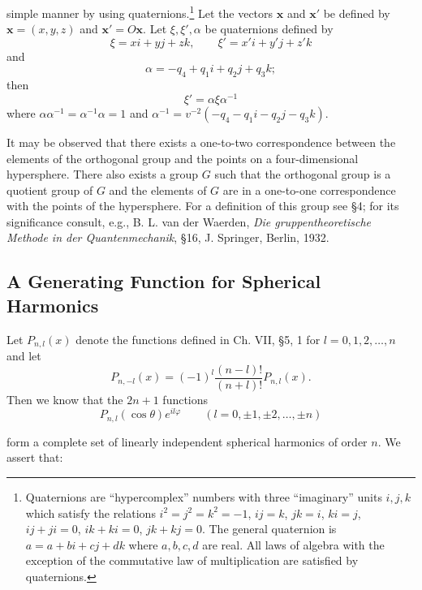 simple manner by using quaternions.\footnote{Quaternions are ``hypercomplex'' numbers with three ``imaginary'' units $i,j,k$ which satisfy the relations $i^2=j^2=k^2=-1$, $ij=k$, $jk=i$, $ki=j$, $ij+ji=0$, $ik+ki=0$, $jk+kj=0$. The general quaternion is $a=a+bi+cj+dk$ where $a,b,c,d$ are real. All laws of algebra with the exception of the commutative law of multiplication are satisfied by quaternions.}
Let the vectors $\mathbf{x}$ and $\mathbf{x}'$ be defined by $\mathbf{x}=(x,y,z)$ and $\mathbf{x}'=O\mathbf{x}$. Let $\xi,\xi',\alpha$ be quaternions defined by
\begin{equation}\tag{116}
\xi=xi+yj+zk,\qquad \xi'=x'i+y'j+z'k
\end{equation}
and
\begin{equation}\tag{116'}
\alpha=-q_4+q_1i+q_2j+q_3k;
\end{equation}
then
\begin{equation}\tag{117}
\xi'=\alpha\xi\alpha^{-1}
\end{equation}
where $\alpha\alpha^{-1}=\alpha^{-1}\alpha=1$ and
$\alpha^{-1}=v^{-2}(-q_4-q_1i-q_2j-q_3k)$.

It may be observed that there exists a one-to-two correspondence between the elements of the orthogonal group and the points on a four-dimensional hypersphere. There also exists a group $G$ such that the orthogonal group is a quotient group of $G$ and the elements of $G$ are in a one-to-one correspondence with the points of the hypersphere. For a definition of this group see \S4; for its significance consult, e.g., B. L. van der Waerden, \emph{Die gruppentheoretische Methode in der Quantenmechanik}, \S16, J. Springer, Berlin, 1932.

\subsection{A Generating Function for Spherical Harmonics}
Let $P_{n,l}(x)$ denote the functions defined in Ch. VII, \S5, 1 for $l=0,1,2,\ldots,n$ and let
\begin{equation}\tag{118}
P_{n,-l}(x)=(-1)^l\frac{(n-l)!}{(n+l)!}P_{n,l}(x).
\end{equation}
Then we know that the $2n+1$ functions
\begin{equation}\tag{119}
P_{n,l}(\cos\theta)e^{il\varphi}\qquad(l=0,\pm1,\pm2,\ldots,\pm n)
\end{equation}

form a complete set of linearly independent spherical harmonics of order $n$. We assert that:

